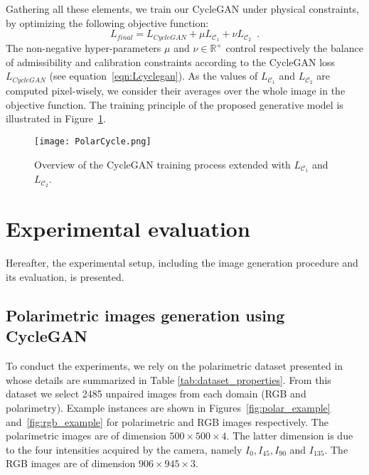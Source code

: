 Gathering all these elements, we train our CycleGAN under physical constraints, by optimizing the following objective function:
\begin{equation}
L_{final}= L_{CycleGAN}+\mu L_{\mathcal{C}_1} + \nu L_{\mathcal{C}_2} \enspace.
\label{eqn:lfinal}
\end{equation}
%
The non-negative hyper-parameters $\mu$ and $\nu \in \mathbb{R}^{+}$ control respectively the balance of admissibility and calibration constraints according to the CycleGAN loss $L_{CycleGAN}$ (see equation~\eqref{eqn:Lcyclegan}). As the values of $L_{\mathcal{C}_1}$ and $L_{\mathcal{C}_2}$ are computed pixel-wisely, we consider their averages over the whole image in the objective function. The training principle of the proposed generative model is illustrated in Figure~\ref{fig:overview_polarCycle}.

\begin{figure} 
	\centering
	\texttt{[image: PolarCycle.png]}
	\caption{Overview of the CycleGAN training process extended with $L_{\mathcal{C}_1}$ and $L_{\mathcal{C}_2}$.}
	\label{fig:overview_polarCycle}
\end{figure}


\section{Experimental evaluation}

Hereafter, the experimental setup, including the image generation procedure and its evaluation, is presented. 

\subsection{Polarimetric images generation using CycleGAN} \label{subsec:polar_gen}

To conduct the experiments, we rely on the polarimetric dataset presented in \citep{Blin2020} whose details are summarized in Table \ref{tab:dataset_properties}. From this dataset we select 2485 unpaired images from each domain (RGB and polarimetry). Example instances are shown in Figures~\ref{fig:polar_example} and~\ref{fig:rgb_example}  for polarimetric and RGB images respectively. The polarimetric images are of dimension $500 \times 500 \times 4$. The latter dimension is due to the four intensities acquired by the camera, namely $I_0, I_{45}, I_{90}$ and $I_{135}$. The RGB images are of dimension $906 \times 945 \times 3$.

